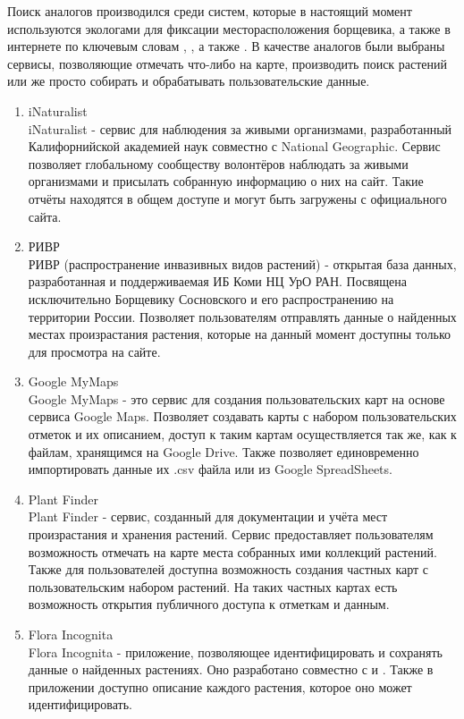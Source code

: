 \nwln
Поиск аналогов производился среди систем, которые в настоящий момент используются экологами для фиксации месторасположения борщевика, а также в интернете по ключевым словам , , а также .
В качестве аналогов были выбраны сервисы, позволяющие отмечать что-либо на карте, производить поиск растений или же просто собирать и обрабатывать пользовательские данные.

\begin{enumerate}[topsep=0pt, parsep=0pt, itemsep=0pt, wide=0.5cm]
	\item iNaturalist \\
	iNaturalist\cite{inaturalist} - сервис для наблюдения за живыми организмами, разработанный Калифорнийской академией наук совместно с National Geographic.
	Сервис позволяет глобальному сообществу волонтёров наблюдать за живыми организмами и присылать собранную информацию о них на сайт.
	Такие отчёты находятся в общем доступе и могут быть загружены с официального сайта.
	\item РИВР \\
	РИВР\cite{rivr} (распространение инвазивных видов растений) - открытая база данных, разработанная и поддерживаемая ИБ Коми НЦ УрО РАН.
	Посвящена исключительно Борщевику Сосновского и его распространению на территории России.
	Позволяет пользователям отправлять данные о найденных местах произрастания растения, которые на данный момент доступны только для просмотра на сайте.
	\item Google MyMaps \\
	Google MyMaps\cite{googlemymaps} - это сервис для создания пользовательских карт на основе сервиса Google Maps.
	Позволяет создавать карты с набором пользовательских отметок и их описанием, доступ к таким картам осуществляется так же, как к файлам, хранящимся на Google Drive.
	Также позволяет единовременно импортировать данные их .csv файла или из Google SpreadSheets.
	\item Plant Finder \\
	Plant Finder\cite{plantfinder} - сервис, созданный для документации и учёта мест произрастания и хранения растений.
	Сервис предоставляет пользователям возможность отмечать на карте места собранных ими коллекций растений.
	Также для пользователей доступна возможность создания частных карт с пользовательским набором растений.
	На таких частных картах есть возможность открытия публичного доступа к отметкам и данным.
	\item Flora Incognita \\
	Flora Incognita\cite{floraincognita} - приложение, позволяющее идентифицировать и сохранять данные о найденных растениях.
	Оно разработано совместно с  и .
	Также в приложении доступно описание каждого растения, которое оно может идентифицировать.
\end{enumerate}

